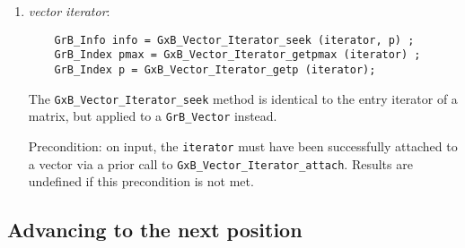 \documentclass[12pt]{article}
\begin{document}
{\begin{enumerate}
        The \verb'GxB_Matrix_Iterator_seek' method moves the \verb'iterator' to
        the given position \verb'p', which is in the range 0 to \verb'pmax'-1,
        where the value of \verb'pmax' is obtained from
        \verb'GxB_Matrix_Iterator_getpmax'.
        For sparse, hypersparse, and full matrices, \verb'pmax' is the same as
        \verb'nvals' returned by \verb'GrB_Matrix_nvals'.  For bitmap matrices,
        \verb'pmax' is equal to \verb'nrows*ncols'.  If \verb'p' $\ge$
        \verb'pmax', the iterator is exhausted and \verb'GxB_EXHAUSTED' is
        returned.  Otherwise, \verb'GrB_SUCCESS' is returned.

        All entries in the matrix are given an ordinal position, \verb'p'.
        Seeking to position \verb'p' will either move the \verb'iterator' to
        that particular position, or to the next higher position containing an
        entry if there is entry at position \verb'p'.  The latter case only
        occurs for bitmap matrices.
        Use \verb'GxB_Matrix_Iterator_getp' to determine the current
        position of the iterator.

        Precondition: on input, the \verb'iterator' must have been successfully
        attached to a matrix via a prior call to
        \verb'GxB_Matrix_Iterator_attach'.  Results are undefined if this
        precondition is not met.

    \item {\em vector iterator}:
    {\footnotesize
    \begin{verbatim}
    GrB_Info info = GxB_Vector_Iterator_seek (iterator, p) ;
    GrB_Index pmax = GxB_Vector_Iterator_getpmax (iterator) ;
    GrB_Index p = GxB_Vector_Iterator_getp (iterator); \end{verbatim}}

        The \verb'GxB_Vector_Iterator_seek' method is identical to the
        entry iterator of a matrix, but applied to a \verb'GrB_Vector' instead.

        Precondition: on input, the \verb'iterator' must have been successfully
        attached to a vector via a prior call to
        \verb'GxB_Vector_Iterator_attach'.  Results are undefined if this
        precondition is not met.

    \end{enumerate}

\subsection{Advancing to the next position}

}
\end{document}
